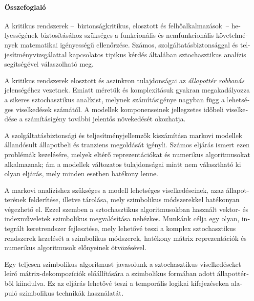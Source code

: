 \begin{otherlanguage}{magyar}

  \paragraph*{Összefoglaló}
  \thispagestyle{plain}

  A kritikus rendszerek --~biztonságkritikus,
  elosztott és felhőalkalmazások~-- helyességének
  biztosításához szükséges a funkcionális és nemfunkcionális
  követelmények matematikai igényességű ellenőrzése. Számos,
  szolgáltatásbiztonsággal és teljesítményvizsgálattal kapcsolatos
  tipikus kérdés általában sztochasztikus analízis segítségével
  válaszolható meg.

  A kritikus rendszerek elosztott és aszinkron tulajdonságai az
  \emph{állapottér robbanás} jelenségéhez vezetnek. Emiatt méretük és
  komplexitásuk gyakran megakadályozza a sikeres sztochasztikus
  analízist, melynek számításigénye nagyban függ a lehetséges
  viselkedések számától. A modellek komponenseinek jellegzetes időbeli
  viselkedése a számításigény további jelentős növekedését okozhatja.

  A szolgáltatásbiztonsági és teljesítményjellemzők kiszámítása
  markovi modellek állandósult állapotbeli és tranziens megoldását
  igényli. Számos eljárás ismert ezen problémák kezelésére, melyek
  eltérő reprezentációkat és numerikus algoritmusokat alkalmaznak; ám
  a modellek változatos tulajdonságai miatt nem választható ki olyan
  eljárás, mely minden esetben hatékony lenne.

  A markovi analízishez szükséges a modell lehetséges viselkedéseinek,
  azaz állapotterének felderítése, illetve tárolása, mely szimbolikus
  módszerekkel hatékonyan végezhető el. Ezzel szemben a sztochasztikus
  algoritmusokban használt vektor- és indexműveletek szimbolikus
  megvalósítása nehézkes. Munkánk célja egy olyan, integrált
  keretrendszer fejlesztése, mely lehetővé teszi a komplex
  sztochasztikus rendszerek kezelését a szimbolikus módszerek,
  hatékony mátrix reprezentációk és numerikus algoritmusok előnyeinek
  ötvözésével.

  Egy teljesen szimbolikus algoritmust javasolunk a sztochasztikus
  viselkedéseket leíró mátrix-dekompozíciók előállítására a
  szimbolikus formában adott állapottérből kiindulva. Ez az eljárás
  lehetővé teszi a temporális logikai kifejezéseken alapuló
  szimbolikus technikák használatát.


\end{otherlanguage}
